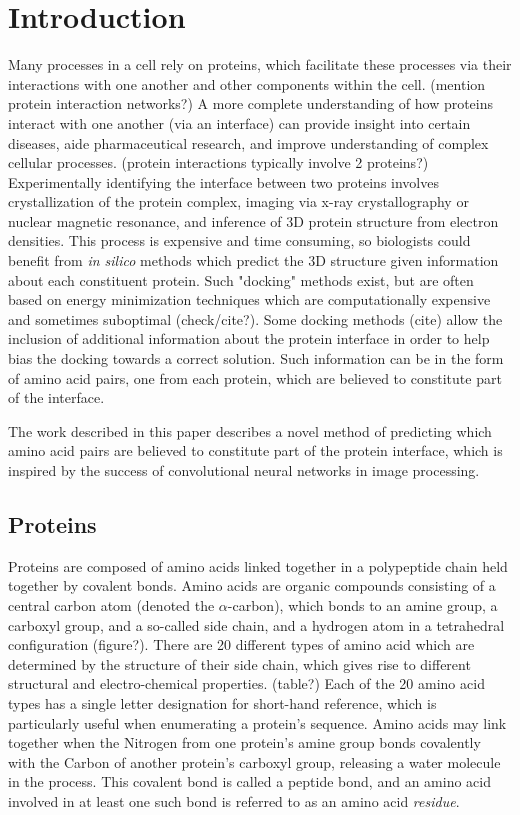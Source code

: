 \chapter{Introduction}
\label{chap:intro}

Many processes in a cell rely on proteins, which facilitate these processes via their interactions with one another and other components within the cell. 
(mention protein interaction networks?)
A more complete understanding of how proteins interact with one another (via an interface) can provide insight into certain diseases, aide pharmaceutical research, and improve understanding of complex cellular processes. 
(protein interactions typically involve 2 proteins?)
Experimentally identifying the interface between two proteins involves crystallization of the protein complex, imaging via x-ray crystallography or nuclear magnetic resonance, and inference of 3D protein structure from electron densities.
This process is expensive and time consuming, so biologists could benefit from \textit{in silico} methods which predict the 3D structure given information about each constituent protein. 
Such "docking" methods exist, but are often based on energy minimization techniques which are computationally expensive and sometimes suboptimal (check/cite?).
Some docking methods (cite) allow the inclusion of additional information about the protein interface in order to help bias the docking towards a correct solution. 
Such information can be in the form of amino acid pairs, one from each protein, which are believed to constitute part of the interface. 

The work described in this paper describes a novel method of predicting which amino acid pairs are believed to constitute part of the protein interface, which is inspired by the success of convolutional neural networks in image processing.

\section{Proteins}

Proteins are composed of amino acids linked together in a polypeptide chain held together by covalent bonds.
Amino acids are organic compounds consisting of a central carbon atom (denoted the $\alpha$-carbon), which bonds to an amine group, a carboxyl group, and a so-called side chain, and a hydrogen atom in a tetrahedral configuration (figure?).
There are 20 different types of amino acid which are determined by the structure of their side chain, which gives rise to different structural and electro-chemical properties. (table?)
Each of the 20 amino acid types has a single letter designation for short-hand reference, which is particularly useful when enumerating a protein's sequence. 
Amino acids may link together when the Nitrogen from one protein's amine group bonds covalently with the Carbon of another protein's carboxyl group, releasing a water molecule in the process.
This covalent bond is called a peptide bond, and an amino acid involved in at least one such bond is referred to as an amino acid \textit{residue}.

